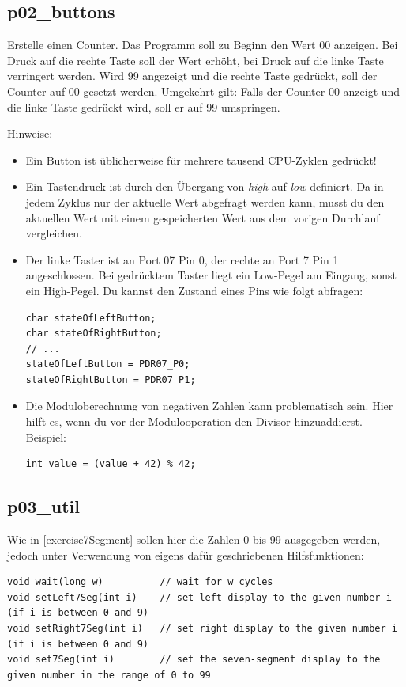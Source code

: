 \subsection{p02\_buttons}
Erstelle einen Counter.
Das Programm soll zu Beginn den Wert 00 anzeigen.
Bei Druck auf die rechte Taste soll der Wert erhöht, bei Druck auf die linke Taste verringert werden.
Wird 99 angezeigt und die rechte Taste gedrückt, soll der Counter auf 00 gesetzt werden.
Umgekehrt gilt:
Falls der Counter 00 anzeigt und die linke Taste gedrückt wird, soll er auf 99 umspringen.

Hinweise:\begin{itemize}
\item
Ein Button ist üblicherweise für mehrere tausend CPU-Zyklen gedrückt!

\item
Ein Tastendruck ist durch den Übergang von \emph{high} auf \emph{low} definiert.
Da in jedem Zyklus nur der aktuelle Wert abgefragt werden kann, musst du den aktuellen Wert mit einem gespeicherten Wert aus dem vorigen Durchlauf vergleichen.

\item
Der linke Taster ist an Port 07 Pin 0, der rechte an Port 7 Pin 1 angeschlossen.
Bei gedrücktem Taster liegt ein Low-Pegel am Eingang, sonst ein High-Pegel.
Du kannst den Zustand eines Pins wie folgt abfragen:
\begin{lstlisting}
char stateOfLeftButton; 
char stateOfRightButton;
// ...
stateOfLeftButton = PDR07_P0; 
stateOfRightButton = PDR07_P1;
\end{lstlisting}

\item
Die Moduloberechnung von negativen Zahlen kann problematisch sein.
Hier hilft es, wenn du vor der Modulooperation den Divisor hinzuaddierst.
Beispiel:
\begin{lstlisting}
int value = (value + 42) % 42;
\end{lstlisting}

\end{itemize}

\subsection{p03\_util}
\label{exercise7SegmentUtil}
Wie in \ref{exercise7Segment} sollen hier die Zahlen 0 bis 99 ausgegeben werden, jedoch unter Verwendung von eigens dafür geschriebenen Hilfsfunktionen:
\begin{lstlisting}
void wait(long w)          // wait for w cycles
void setLeft7Seg(int i)    // set left display to the given number i (if i is between 0 and 9)
void setRight7Seg(int i)   // set right display to the given number i (if i is between 0 and 9)
void set7Seg(int i)        // set the seven-segment display to the given number in the range of 0 to 99
\end{lstlisting}

